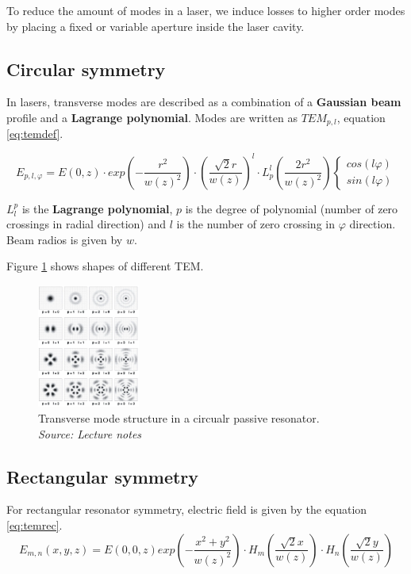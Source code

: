 To reduce the amount of modes in a laser, we induce losses to higher order modes by placing a 
fixed or variable aperture inside the laser cavity.

\subsection{Circular symmetry}
In lasers, transverse modes are described as a combination of a \textbf{Gaussian beam} profile 
and a \textbf{Lagrange polynomial}. Modes are written as $TEM_{p,l}$, equation \ref{eq:temdef}.

\begin{equation}
    E_{p,l, \varphi} = E(0,z) \cdot exp\left( -\frac{r^2}{w(z)^2} \right) \cdot \left(\frac{\sqrt{2}r}{w(z)}\right)^l \cdot L^l_p \left(\frac{2r^2}{w(z)^2} \right) \begin{cases}
        cos(l\varphi)\\
        sin(l\varphi)
    \end{cases}
    \label{eq:temdef}
\end{equation}

$L^p_l$ is the \textbf{Lagrange polynomial}, $p$ is the degree of polynomial (number of zero crossings in radial direction) and $l$ is the number of zero crossing in $\varphi$ direction. 
Beam radios is given by $w$.

Figure \ref{fig:tmcr} shows shapes of different TEM.
\begin{figure}[h!]
    \centering
    \includegraphics[width=0.3\textwidth]{slike/tmcr.png}
    \caption{Transverse mode structure in a circualr passive resonator.\\ \textit{Source: Lecture notes}}
    \label{fig:tmcr}
\end{figure}


\subsection{Rectangular symmetry}
For rectangular resonator symmetry, electric field is given by the equation \ref{eq:temrec}.
\begin{equation}
    E_{m,n} (x,y,z) = E(0,0,z) exp \left( -\frac{x^2+y^2}{w(z)^2} \right) \cdot H_m \left(\frac{\sqrt{2}x}{w(z)} \right) \cdot H_n \left(\frac{\sqrt{2}y}{w(z)} \right)
    \label{fig:temrec}
\end{equation}

